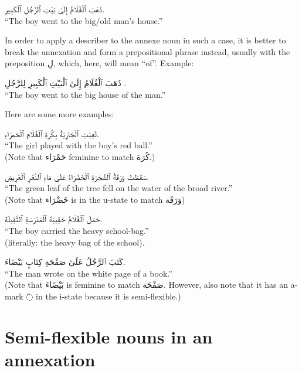 \documentclass[
  10pt,
]{book}
\begin{document}
\foreignlanguage{arabic}{ذَهَبَ ٱلْغُلَامُ إِلَىٰ بَيْتِ ٱلرَّجُلِ ٱلْکَبِيرِ.}\\
\enquote{The boy went to the big/old man's house.}

In order to apply a describer to the annexe noun in such a case, it is better to break the annexation and form a prepositional phrase instead, usually with the preposition \foreignlanguage{arabic}{لِ}, which, here, will mean \enquote{of}. Example:

\foreignlanguage{arabic}{ذَهَبَ ٱلْغُلَامُ إِلَىٰ ٱلْبَيْتِ ٱلْکَبِيرِ لِلرَّجُلِ .}\\
\enquote{The boy went to the big house of the man.}

Here are some more examples:

\foreignlanguage{arabic}{لَعِبَتِ ٱلْجَارِيَةُ بِکُرَةِ ٱلْغُلَامِ ٱلْحَمرَاءِ.}\\
\enquote{The girl played with the boy's red ball.}\\
(Note that \foreignlanguage{arabic}{حَمْرَاء} feminine to match \foreignlanguage{arabic}{کُرَة}.)

\foreignlanguage{arabic}{سَقَطَتْ وَرَقَةُ ٱلشَّجَرَةِ ٱلْخَضْرَاءُ عَلَىٰ مَاءِ ٱلنَّعْرِ ٱلْعَرِيضِ.}\\
\enquote{The green leaf of the tree fell on the water of the broad river.}\\
(Note that \foreignlanguage{arabic}{خَضْرَاء} is in the u-state to match \foreignlanguage{arabic}{وَرَقَة})

\foreignlanguage{arabic}{حَمَلَ ٱلْغُلَامُ حَقِيبَةَ ٱلْمَدْرَسَةِ ٱلثَّقِيلَةَ.}\\
\enquote{The boy carried the heavy school-bag.}\\
(literally: the heavy bag of the school).

\foreignlanguage{arabic}{کَتَبَ ٱلرَّجُلُ عَلَىٰ صَفْحَةِ کِتَابٍ بَيْضَاءَ.}\\
\enquote{The man wrote on the white page of a book.}\\
(Note that \foreignlanguage{arabic}{بَيْضَاءَ} is feminine to match \foreignlanguage{arabic}{صَفْحَة}. However, also note that it has an a-mark \foreignlanguage{arabic}{◌َ} in the i-state because it is semi-flexible.)

\section{Semi-flexible nouns in an annexation}\label{semi-flexible-nouns-in-an-annexation}
\end{document}

